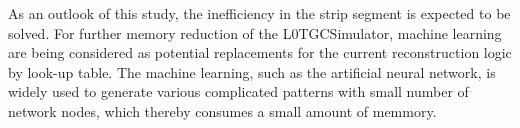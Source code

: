 As an outlook of this study, the inefficiency in the strip segment is expected to be solved. For further memory reduction of the L0TGCSimulator, machine learning are being considered as potential replacements for the current reconstruction logic by look-up table. The machine learning, such as the artificial neural network, is widely used to generate various complicated patterns with small number of network nodes, which thereby consumes a small amount of memmory. 
